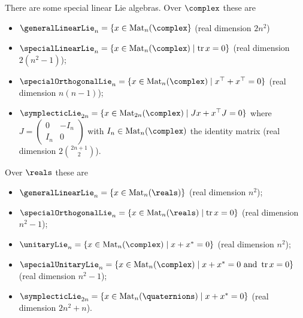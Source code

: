 \documentclass[fleqn]{NotesClass}
\DeclareMathOperator{\Mat}{Mat}
\newcommand{\trans}{\top}
\DeclareMathOperator{\tr}{tr}
\begin{document}
    There are some special linear Lie algebras.
    Over \(\complex\) these are
    \begin{itemize}
        \item \(\generalLinearLie_n = \{x \in \Mat_n(\complex\}\) (real dimension \(2n^2\))
        \item \(\specialLinearLie_n = \{x \in \Mat_n(\complex) \mid \tr x = 0\}\) (real dimension \(2(n^2 - 1)\));
        \item \(\specialOrthogonalLie_n = \{x \in \Mat_n(\complex) \mid x^{\trans} + x^{\trans} = 0\}\) (real dimension \(n(n - 1)\));
        \item \(\symplecticLie_{2n} = \{x \in \Mat_{2n}(\complex) \mid Jx + x^{\trans}J = 0\}\) where \(J = \begin{pmatrix} 0 & -I_n\\ I_n & 0 \end{pmatrix}\) with \(I_n \in \Mat_n(\complex)\) the identity matrix (real dimension \(2 \binom{2n + 1}{2}\)).
    \end{itemize}
    Over \(\reals\) these are
    \begin{itemize}
        \item \(\generalLinearLie_n = \{x \in \Mat_n(\reals)\}\) (real dimension \(n^2\));
        \item \(\specialOrthogonalLie_n = \{x \in \Mat_n(\reals) \mid \tr x = 0\}\) (real dimension \(n^2 - 1\));
        \item \(\unitaryLie_n = \{x \in \Mat_n(\complex) \mid x + x^* = 0\}\) (real dimension \(n^2\));
        \item \(\specialUnitaryLie_n = \{x \in \Mat_n(\complex) \mid x + x^* = 0 \text{ and } \tr x = 0\}\) (real dimension \(n^2 - 1\));
        \item \(\symplecticLie_{2n} = \{x \in \Mat_n(\quaternions) \mid x + x^* = 0\}\) (real dimension \(2n^2 + n\)).
    \end{itemize}
    
\end{document}
